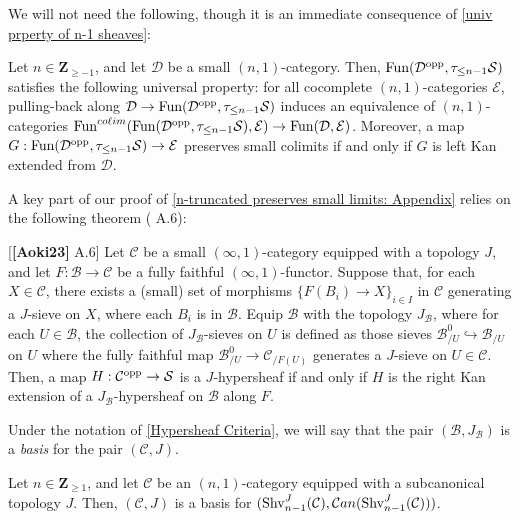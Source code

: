 \documentclass[10pt]{article}
\newcommand{\mS}{\mathcal S}
\newcommand{\C}{\mathcal C}
\newcommand{\cB}{\mathcal{B}}
\newcommand{\cD}{\mathcal{D}}
\newcommand{\cE}{\mathcal{E}}
\newcommand{\ZZ}{\mathbb{Z}}
\def\ZZ{{\mathbf Z}}
\theoremstyle{witharg}
\theoremstyle{witharg}
\theoremstyle{witharg2}
\begin{document}
\noindent We will not need the following, though it is an immediate consequence of \ref{univ prperty of n-1 sheaves}:


\begin{corollary}{}\label{Univ prop of n-1 presheaves}
    Let $n\in \ZZ_{\geq -1}$, and let $\cD$ be a small $(n,1)$-category. Then, $\textnormal{Fun}(\cD^{\textnormal{opp}},\tau_{\leq n-1}\mS)$ satisfies the following universal property: for all cocomplete $(n,1)$-categories $\cE$, pulling-back along $\cD\rightarrow \textnormal{Fun}(\cD^{\textnormal{opp}},\tau_{\leq n-1}\mS)$ induces an equivalence of $(n,1)$-categories $\textnormal{Fun}^{co \ell im}(\textnormal{Fun}(\cD^{\textnormal{opp}},\tau_{\leq n-1}\mS),\cE)\rightarrow \textnormal{Fun}(\cD,\cE)$. Moreover, a map $G:\textnormal{Fun}(\cD^{\textnormal{opp}},\tau_{\leq n-1}\mS)\rightarrow \cE$ preserves small colimits if and only if $G$ is left Kan extended from $\cD$.
\end{corollary}


\noindent A key part of our proof of \ref{n-truncated preserves small limits: Appendix} relies on the following theorem ( A.6):



\begin{theorem}{}[\textbf{[Aoki23]} A.6]\label{Hypersheaf Criteria}
    Let $\C$ be a small $(\infty,1)$-category equipped with a topology $J$, and let $F:\cB\rightarrow \C$ be a fully faithful $(\infty,1)$-functor. Suppose that, for each $X\in \C$, there exists a (small) set of morphisms $\{F(B_i)\rightarrow X\}_{i\in I}$ in $\C$ generating a $J$-sieve on $X$, where each $B_i$ is in $\cB$. Equip $\cB$ with the topology $J_\cB$, where for each $U\in \cB$, the collection of $J_\cB$-sieves on $U$ is defined as those sieves $\cB^0_{/U}\hookrightarrow \cB_{/U}$ on $U$ where the fully faithful map $\cB^0_{/U}\rightarrow \C_{/F(U)}$ generates a $J$-sieve on $U\in \C$. Then, a map $H:\C^{\textnormal{opp}}\rightarrow \mS$ is a $J$-hypersheaf if and only if $H$ is the right Kan extension of a $J_\cB$-hypersheaf on $\cB$ along $F$. 

\end{theorem}

\begin{definition}{}\label{Basis Definition}
    Under the notation of \ref{Hypersheaf Criteria}, we will say that the pair $(\cB,J_\cB)$ is a \emph{basis} for the pair $(\C,J)$.
\end{definition}


\begin{proposition}{}\label{Basis for Eff Epi n Topoi}

    Let $n\in \ZZ_{\geq 1}$, and let $\C$ be an $(n,1)$-category equipped with a subcanonical topology $J$. Then, $(\C,J)$ is a basis for $(\textnormal{Shv}^J_{n-1}(\C),\C an(\textnormal{Shv}^J_{n-1}(\C)))$.
    
\end{proposition}
\end{document}
